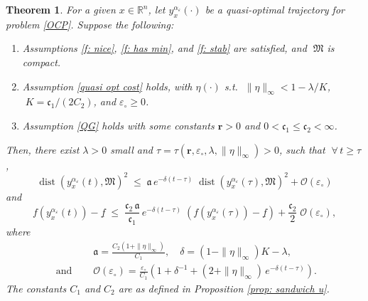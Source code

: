 \documentclass[12pt]{amsart}
\numberwithin{equation}{section}
\theoremstyle{plain}
\newtheorem{theorem}{Theorem}[section]
\begin{document}
\begin{theorem}\label{thm: conv of traj}
For a given $x\in\mathbb{R}^{n}$, let $y_{x}^{\alpha_{\varepsilon}}(\cdot)$ be a quasi-optimal trajectory for problem \eqref{OCP}. Suppose the following: 
\begin{enumerate}[label = -]
    \item Assumptions \ref{f: nice}, \ref{f: has min}, and \ref{f: stab} are satisfied, and $\;\mathfrak{M}$ is compact.
    \item Assumption \ref{quasi opt cost} holds, with $\eta(\cdot)$ s.t. $\;\|\eta\|_{\infty} < 1- \lambda/K$, $\;K=\mathfrak{c}_{1}/(2C_{2})$, and $\varepsilon_{\circ}\geq0$. 
    \item Assumption \ref{QG} holds  with some constants $\mathbf{r}>0$ and $0<\mathfrak{c}_{1}\leq \mathfrak{c}_{2}<\infty$.
\end{enumerate}
Then, there exist $\lambda>0$ small and $\tau = \tau(\mathbf{r},\varepsilon_{\circ}, \lambda,\|\eta\|_{\infty})>0$, such that $\; \forall\,t\geq\tau$,
\begin{equation*}
    \operatorname{dist}(y_{x}^{\alpha_{\varepsilon}}(t),\mathfrak{M})^{2} 
    \; \leq \;  
    \mathfrak{a}\,e^{-\delta(t-\tau)}\;\operatorname{dist}(y_{x}^{\alpha_{\varepsilon}}(\tau),\mathfrak{M})^{2} + \mathcal{O}(\varepsilon_{\circ})
\end{equation*}
and
\begin{equation*}
    f(y_{x}^{\alpha_{\varepsilon}}(t))-\underline{f} 
    \; \leq \;  
    \frac{\mathfrak{c}_2\,\mathfrak{a}}{\mathfrak{c}_1}\,e^{-\delta(t-\tau)}\;(f(y_{x}^{\alpha_{\varepsilon}}(\tau))-\underline{f}) + \frac{\mathfrak{c}_2}{2}\;\mathcal{O}(\varepsilon_{\circ}),
\end{equation*}
where
\begin{equation*}
\begin{aligned}
    & \mathfrak{a}=\frac{C_{2}(1+\|\eta\|_{\infty})}{C_{1}}, \quad \delta = (1-\|\eta\|_{\infty})K - \lambda,\\
    \text{ and } \quad& \mathcal{O}(\varepsilon_{\circ}) = \frac{\varepsilon_{\circ}}{C_{1}}\left(1+\delta^{-1} + (2+\|\eta\|_{\infty})\, e^{-\delta(t-\tau)}\right).
\end{aligned}
\end{equation*}
The constants $C_{1}$ and $C_{2}$ are as defined in Proposition \ref{prop: sandwich u}. 
\end{theorem}
\end{document}

